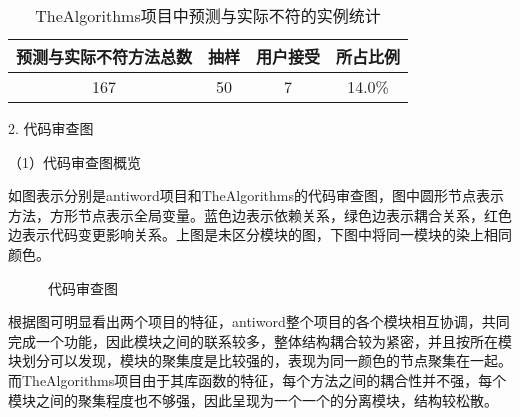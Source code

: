 \begin{table}[htbp]
\caption{TheAlgorithms项目中预测与实际不符的实例统计}
\vspace{0.5em}\centering\wuhao
\begin{tabular}{cccc}
\toprule
预测与实际不符方法总数 & 抽样 & 用户接受 & 所占比例 \\
\midrule
167 & 50 & 7 & 14.0\% \\
\bottomrule
\end{tabular}
\end{table}


2. 代码审查图

（1）代码审查图概览

如图表示分别是antiword项目和TheAlgorithms的代码审查图，图中圆形节点表示方法，方形节点表示全局变量。蓝色边表示依赖关系，绿色边表示耦合关系，红色边表示代码变更影响关系。上图是未区分模块的图，下图中将同一模块的染上相同颜色。

\begin{figure}[!h]
    \setlength{\subfigcapskip}{-1bp}
    \centering
    \begin{minipage}{\textwidth}
    \centering
    \hspace{2em}
    \end{minipage}
    \centering
    \begin{minipage}{\textwidth}
    \centering
    \hspace{2em}
    \end{minipage}
    \vspace{0.2em}
    \caption{代码审查图} %
\end{figure}



根据图可明显看出两个项目的特征，antiword整个项目的各个模块相互协调，共同完成一个功能，因此模块之间的联系较多，整体结构耦合较为紧密，并且按所在模块划分可以发现，模块的聚集度是比较强的，表现为同一颜色的节点聚集在一起。而TheAlgorithms项目由于其库函数的特征，每个方法之间的耦合性并不强，每个模块之间的聚集程度也不够强，因此呈现为一个一个的分离模块，结构较松散。

